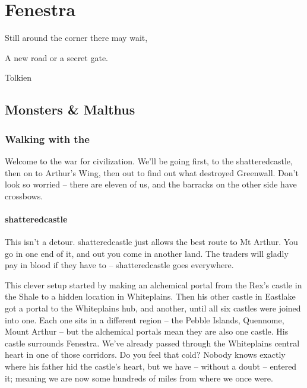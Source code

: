 \chapter{Fenestra}

\epigraph{Still around the corner there may wait,

A new road or a secret gate.}{Tolkien}

\section{Monsters \& Malthus}

\begin{multicols}{2}

\subsection{Walking with the }

\begin{exampletext}

	Welcome to the war for civilization.
	We'll be going first, to the \gls{shatteredcastle}, then on to Arthur's Wing, then out to find out what destroyed Greenwall.
	Don't look so worried -- there are eleven of us, and the barracks on the other side have crossbows.

\end{exampletext}

\subsubsection{\Gls{shatteredcastle}}

\begin{exampletext}

	This isn't a detour.
	\Gls{shatteredcastle} just allows the best route to Mt Arthur.
	You go in one end of it, and out you come in another land.
	The traders will gladly pay in blood if they have to -- \gls{shatteredcastle} goes everywhere.

	This clever setup started by making an alchemical portal from the Rex's castle in the Shale to a hidden location in Whiteplains.
	Then his other castle in Eastlake got a portal to the Whiteplains hub, and another, until all six castles were joined into one.
	Each one sits in a different region -- the Pebble Islands, Quennome, Mount Arthur -- but the alchemical portals mean they are also one castle.
	His castle surrounds Fenestra.
	We've already passed through the Whiteplains central heart in one of those corridors.
	Do you feel that cold?
	Nobody knows exactly where his father hid the castle's heart, but we have -- without a doubt -- entered it; meaning we are now some hundreds of miles from where we once were.


\end{exampletext}
\end{multicols}

